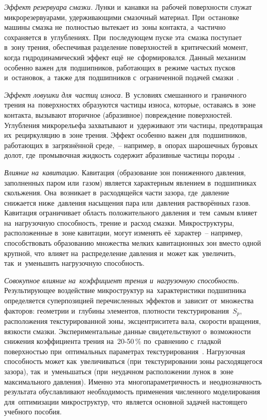 \textit{Эффект резервуара смазки.} Лунки и~канавки на~рабочей поверхности служат микрорезервуарами, удерживающими смазочный материал. При~остановке машины смазка не~полностью вытекает из~зоны контакта, а~частично сохраняется в~углублениях. При~последующем пуске эта~смазка поступает в~зону трения, обеспечивая разделение поверхностей в~критический момент, когда гидродинамический эффект ещё~не~сформировался. Данный механизм особенно важен для~подшипников, работающих в~режиме частых пусков и~остановок, а~также для~подшипников с~ограниченной подачей смазки~\cite{bashmur2022,filho2021}.

\textit{Эффект ловушки для~частиц износа.} В~условиях смешанного и~граничного трения на~поверхностях образуются частицы износа, которые, оставаясь в~зоне контакта, вызывают вторичное (абразивное) повреждение поверхностей. Углубления микрорельефа захватывают и~удерживают эти частицы, предотвращая их~рециркуляцию в~зоне трения. Эффект особенно важен для~подшипников, работающих в~загрязнённой среде,~-- например, в~опорах шарошечных буровых долот, где~промывочная жидкость содержит абразивные частицы породы~\cite{bashmur2024a}.

\textit{Влияние на~кавитацию.} Кавитация (образование зон пониженного давления, заполненных паром или~газом) является характерным явлением в~подшипниках скольжения. Она~возникает в~расходящейся части зазора, где~давление снижается ниже~давления насыщения пара или~давления растворённых газов. Кавитация ограничивает область положительного давления и~тем~самым влияет на~нагрузочную способность, трение и~расход смазки. Микроструктуры, расположенные в~зоне кавитации, могут изменять её~характер~-- например, способствовать образованию множества мелких кавитационных зон вместо одной крупной, что~влияет на~распределение давления и~может как~увеличить, так~и~уменьшить нагрузочную способность.

\textit{Совокупное влияние на~коэффициент трения и~нагрузочную способность.} Результирующее воздействие микроструктур на~характеристики подшипника определяется суперпозицией перечисленных эффектов и~зависит от~множества факторов: геометрии и~глубины элементов, плотности текстурирования~$S_p$, расположения текстурированной зоны, эксцентриситета вала, скорости вращения, вязкости смазки. Экспериментальные данные свидетельствуют о~возможности снижения коэффициента трения на~20-50\,\% по~сравнению с~гладкой поверхностью при~оптимальных параметрах текстурирования~\cite{galda2019,yamada2018,ranjan2021}. Нагрузочная способность может как~увеличиваться (при~текстурировании зоны расходящегося зазора), так~и~уменьшаться (при~неудачном расположении лунок в~зоне максимального давления). Именно эта~многопараметричность и~неоднозначность результата обуславливают необходимость применения численного моделирования для~оптимизации микроструктур, что~является основной задачей настоящего учебного пособия.

